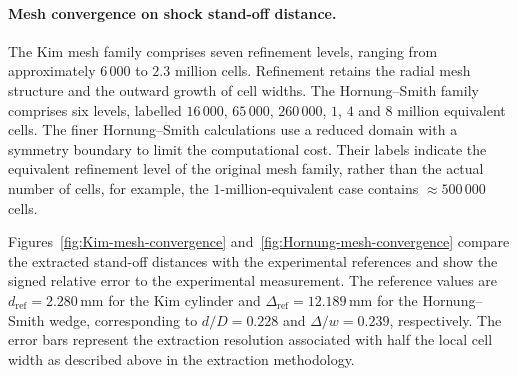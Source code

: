 \paragraph{Mesh convergence on shock stand-off distance.}

The Kim mesh family comprises seven refinement levels, ranging from approximately
\(6\,000\) to \(2.3\) million cells. Refinement retains the radial mesh structure
and the outward growth of cell widths. The Hornung--Smith family comprises six
levels, labelled \(16\,000\), \(65\,000\), \(260\,000\), \(1\), \(4\) and
\(8\) million equivalent cells. The finer Hornung--Smith calculations use a
reduced domain with a symmetry boundary to limit the computational cost. Their
labels indicate the equivalent refinement level of the original mesh family,
rather than the actual number of cells, for example, the \(1\)-million-equivalent
case contains \(\approx500\,000\) cells.
\par\medskip

Figures~\ref{fig:Kim-mesh-convergence} and~\ref{fig:Hornung-mesh-convergence}
compare the extracted stand-off distances with the experimental references and
show the signed relative error to the experimental measurement. The reference values are
\(d_{\mathrm{ref}}=2.280\,\mathrm{mm}\) for the Kim cylinder and \(\Delta_{\mathrm{ref}}=12.189\,\mathrm{mm}\) for the Hornung--Smith wedge, corresponding to \(d/D=0.228\) and \(\Delta/w=0.239\), respectively. The error bars represent the extraction resolution associated with half the
local cell width as described above in the extraction methodology.


